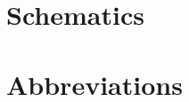 \appendix
\section{Schematics}
\label{sec:schematics}
\newpage

\section{Abbreviations}
\label{sec:abbreviations}
 \newpage
